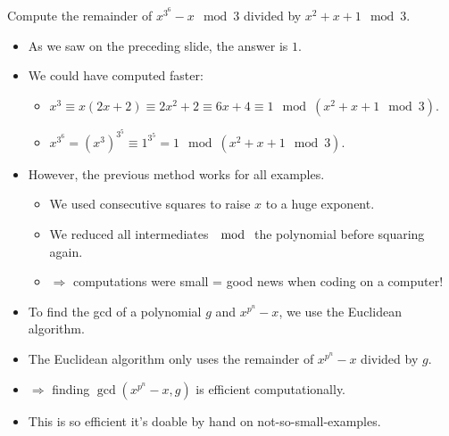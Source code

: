\begin{frame}
\footnotesize
\vskip -0.22cm
\begin{example}\vskip -0.1cm
Compute the remainder of  $x^{3^{6}}-x \mod 3$ divided by $x^2+x+1\mod 3$.
\end{example}
\begin{itemize}
\item<2-> As we saw on the preceding slide, the answer is $1$.
\item<3-> We could have computed faster: 
\begin{itemize}
\footnotesize
\item<3-> $ x^{3}\equiv x\left(2x+2\right)\equiv 2x^2+2\equiv 6x+4\equiv 1 \mod \left(x^2+x+1\mod 3\right) $.
\item<4-> $x^{3^6}= \left( x^3\right)^{3^5}\equiv 1^{3^5}=1\mod \left(x^2+x+1\mod 3\right)$.
\end{itemize}
\item<5-> However, the previous method works for all examples.
\begin{itemize}
\footnotesize
\item<6-> We used consecutive squares to raise $x$ to a huge exponent.
\item<7-> We reduced all intermediates $\mod$ the polynomial before squaring again.
\item<8-> $\Rightarrow$ computations were small = good news when coding on a computer!
\end{itemize}
\item<9-> To find the gcd of a polynomial $g$ and $x^{p^n}-x$, we use the Euclidean algorithm.
\item<10-> The Euclidean algorithm only uses the remainder of $x^{p^n}-x$ divided by $g$.
\item<11-> $\Rightarrow$ finding $\gcd\left( x^{p^n}-x,g\right)$ is efficient computationally.
\item<12-> This is so efficient it's doable by hand on not-so-small-examples.
\end{itemize}


\vskip 10cm
\end{frame}